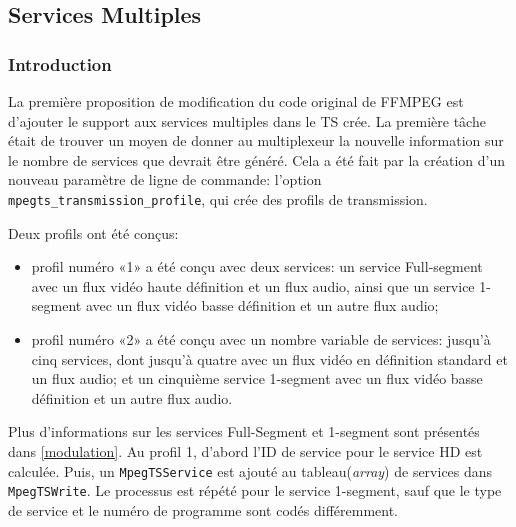 \documentclass[12pt,a4paper]{article}
\begin{document}
\subsection{Services Multiples}

\subsubsection{Introduction}


La première proposition de modification du code original de FFMPEG est d'ajouter le support aux services multiples dans le TS crée. La première tâche était de trouver un moyen de donner au multiplexeur la nouvelle information sur le nombre de services que devrait être généré. Cela a été fait par la création d'un nouveau paramètre de ligne de commande: l'option \texttt{mpegts\hspace{0.1mm}\_\hspace{0.1mm}transmission\hspace{0.1mm}\_\hspace{0.1mm}profile}, qui crée des profils de transmission.

Deux profils ont été conçus:
\begin{itemize}
\item profil numéro «1» a été conçu avec deux services: un service Full-segment avec un flux vidéo haute définition et un flux audio, ainsi que un service 1-segment avec un flux vidéo basse définition et un autre flux audio;
\item profil numéro «2» a été conçu avec un nombre variable de services: jusqu'à cinq services, dont jusqu'à quatre avec un flux vidéo en définition standard et un flux audio; et un cinquième service 1-segment avec un flux vidéo basse définition et un autre flux audio.
\end{itemize}

Plus d'informations sur les services Full-Segment et 1-segment sont présentés dans \autoref {modulation}. Au profil 1, d'abord l'ID de service pour le service HD est calculée. Puis, un \texttt{MpegTSService} est ajouté au tableau(\textit{array}) de services dans \texttt{MpegTSWrite}. Le processus est répété pour le service 1-segment, sauf que le type de service et le numéro de programme sont codés différemment.
\end{document}
